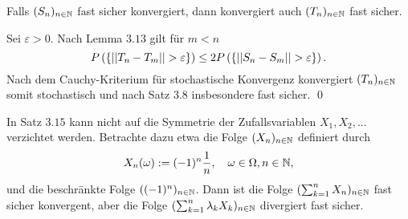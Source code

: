 \begin{theorem}
    Falls $(S_n)_{n \in \mathbb{N}}$ fast sicher konvergiert, dann konvergiert auch $(T_n)_{n \in \mathbb{N}}$ fast sicher. 
\end{theorem}
\begin{proof*}
    Sei $\varepsilon > 0$. Nach Lemma $3.13$ gilt für $m < n$
    $$
        P\left(\left\{ \lvert\lvert T_n - T_m \rvert\rvert > \varepsilon \right\}\right) \leq 2P\left(\left\{ \lvert\lvert S_n - S_m \rvert\rvert > \varepsilon \right\}\right). 
    $$
    Nach dem Cauchy-Kriterium für stochastische Konvergenz konvergiert $(T_n)_{n \in \mathbb{N}}$ somit stochastisch und nach Satz $3.8$ insbesondere fast sicher. \qed
\end{proof*}

\begin{remark}
    In Satz $3.15$ kann nicht auf die Symmetrie der Zufallsvariablen $X_1,X_2,...$ verzichtet werden. Betrachte dazu etwa die Folge $(X_n)_{n \in \mathbb{N}}$ definiert durch
    $$
        X_n(\omega) := (-1)^n \frac{1}{n},  \quad \omega \in \Omega, n \in \mathbb{N}, 
    $$ 
    und die beschränkte Folge $((-1)^n)_{n \in \mathbb{N}}$. Dann ist die Folge $(\sum_{k=1}^n X_n)_{n \in \mathbb{N}}$ fast sicher konvergent, aber die Folge $(\sum_{k=1}^n\lambda_k X_k)_{n \in \mathbb{N}}$ divergiert fast sicher. 
    \qexampled
\end{remark}